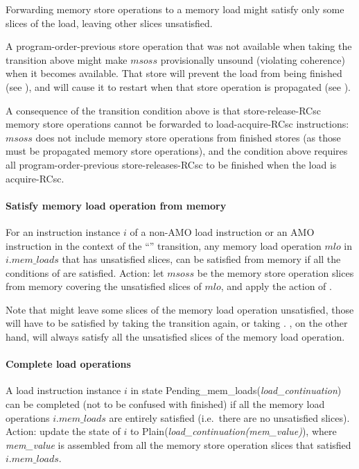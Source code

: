 \begin{commentary}
Forwarding memory store operations to a memory load might satisfy only some slices of the load, leaving other slices unsatisfied.

A program-order-previous store operation that was not available when taking the transition above might make $msoss$ provisionally unsound (violating coherence) when it becomes available.
That store will prevent the load from being finished (see ), and will cause it to restart when that store operation is propagated (see ).

A consequence of the transition condition above is that store-release-RCsc memory store operations cannot be forwarded to load-acquire-RCsc instructions:
$msoss$ does not include memory store operations from finished stores (as those must be propagated memory store operations), and the condition above requires all program-order-previous store-releases-RCsc to be finished when the load is acquire-RCsc.
\end{commentary}


\paragraph{Satisfy memory load operation from memory}\label{omm:sat_from_mem}
For an instruction instance $i$ of a non-AMO load instruction or an AMO instruction in the context of the ``'' transition, any memory load operation $mlo$ in $i.\textit{mem\_loads}$ that has unsatisfied slices, can be satisfied from memory if all the conditions of  are satisfied.
Action: let $msoss$ be the memory store operation slices from memory covering the unsatisfied slices of $mlo$, and apply the action of .

\begin{commentary}
Note that  might leave some slices of the memory load operation unsatisfied, those will have to be satisfied by taking the transition again, or taking .
, on the other hand, will always satisfy all the unsatisfied slices of the memory load operation.
\end{commentary}


\paragraph{Complete load operations}\label{omm:complete_loads}
A load instruction instance $i$ in state {\sc Pending\_mem\_loads}({\it load\_continuation}) can be completed (not to be confused with finished) if all the memory load operations $i.\textit{mem\_loads}$ are entirely satisfied (i.e.~there are no unsatisfied slices).
Action: update the state of $i$ to {\sc Plain}({\it load\_continuation(mem\_value)}), where {\it mem\_value} is assembled from all the memory store operation slices that satisfied $i.\textit{mem\_loads}$.


